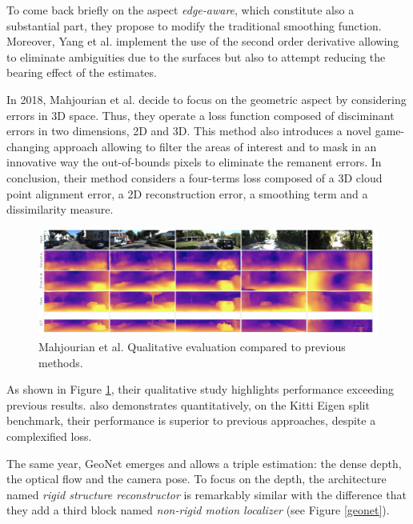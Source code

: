 To come back briefly on the aspect \emph{edge-aware}, which constitute also a substantial part, they propose to modify the traditional smoothing function. Moreover, Yang et al. implement the use of the second order derivative allowing to eliminate ambiguities due to the surfaces but also to attempt reducing the bearing effect of the estimates.


In 2018, Mahjourian et al.\cite{mahjourian2018unsupervised} decide to focus on the geometric aspect by considering errors in 3D space. Thus, they operate a loss function composed of disciminant errors in two dimensions, 2D and 3D. 
This method also introduces a novel game-changing approach allowing to filter the areas of interest and to mask in an innovative way the out-of-bounds pixels to eliminate the remanent errors. In conclusion, their method considers a four-terms loss composed of a 3D cloud point alignment error, a 2D reconstruction error, a smoothing term and a dissimilarity measure.

\begin{figure}[h]
	\centering
	\includegraphics[width=\linewidth]{Figures/SOA/mahjourian-illu}
	\caption[Mahjourian et al. Qualitative evaluation compared to previous methods..]{Mahjourian et al.\cite{mahjourian2018unsupervised} Qualitative evaluation compared to previous methods.}
	\label{mahjourian-illu}
\end{figure}


As shown in Figure \ref{mahjourian-illu}, their qualitative study highlights performance exceeding previous results. \cite{mahjourian2018unsupervised} also demonstrates quantitatively, on the Kitti Eigen split benchmark, their performance is superior to previous approaches, despite a complexified loss.


The same year, GeoNet \cite{yin2018geonet} emerges and allows a triple estimation: the dense depth, the optical flow and the camera pose. To focus on the depth, the architecture named \emph{rigid structure reconstructor} is remarkably similar with the difference that they add a third block named \emph{non-rigid motion localizer} (see Figure \ref{geonet}).

